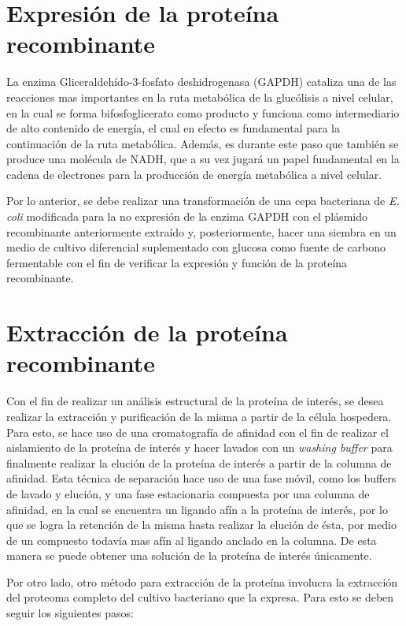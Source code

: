 \documentclass[12pt]{article}
\begin{document}
	\section{Expresión de la proteína recombinante}
	
	La enzima Gliceraldehído-3-fosfato deshidrogenasa (GAPDH) cataliza una de las reacciones mas importantes en la ruta metabólica de la glucólisis a nivel celular, en la cual se forma bifosfoglicerato como producto y funciona como intermediario de alto contenido de energía, el cual en efecto es fundamental para la continuación de la ruta metabólica. Además, es durante este paso que tambi\'en se produce una molécula de NADH, que a su vez jugará un papel fundamental en la cadena de electrones para la producción de energía metabólica a nivel celular.
	
	Por lo anterior, se debe realizar una transformación de una cepa bacteriana de \textit{E. coli} modificada para la no expresión de la enzima GAPDH con el plásmido recombinante anteriormente extraído y, posteriormente, hacer una siembra en un medio de cultivo diferencial suplementado con glucosa como fuente de carbono fermentable con el fin de verificar la expresión y función de la proteína recombinante.
	
	\section{Extracción de la proteína recombinante}
	Con el fin de realizar un análisis estructural de la proteína de interés, se desea realizar la extracción y purificación de la misma a partir de la célula hospedera. Para esto, se hace uso de una cromatografía de afinidad con el fin de realizar el aislamiento de la proteína de interés y hacer lavados con un \textit{washing buffer} para finalmente realizar la elución de la proteína de interés a partir de la columna de afinidad. Esta técnica de separación hace uso de una fase móvil, como los buffers de lavado y elución, y una fase estacionaria compuesta por una columna de afinidad, en la cual se encuentra un ligando afín a la proteína de interés, por lo que se logra la retención de la misma hasta realizar la elución de ésta, por medio de un compuesto todavía mas afín al ligando anclado en la columna. De esta manera se puede obtener una solución de la proteína de interés únicamente.
	
	Por otro lado, otro método para extracción de la proteína involucra la extracción del proteoma completo del cultivo bacteriano que la expresa. Para esto se deben seguir los siguientes pasos:
	
\end{document}
